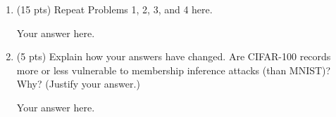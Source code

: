 %
\begin{enumerate}
%
	\item (15 pts) Repeat Problems 1, 2, 3, and 4 here.

	\begin{answer}
	
		Your answer here.
		
	\end{answer}
	
	
	\item (5 pts) Explain how your answers have changed. Are CIFAR-100 records more or less vulnerable to membership inference attacks (than MNIST)? Why? (Justify your answer.)
	
	\begin{answer}
	
		Your answer here.
		
	\end{answer}
	
%
\end{enumerate}






